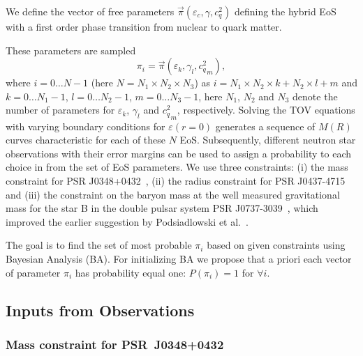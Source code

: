 {We define the vector of free parameters $\overrightarrow{\pi}\left(\varepsilon_{c},\gamma,{c}_{q}^{2}\right)$
defining the hybrid EoS with a first order phase transition from nuclear
to quark matter. %
}

{These parameters are sampled
\begin{equation}
\pi_{i}=\overrightarrow{\pi}\left(\varepsilon_{k},\gamma_{l},{{c}_{q}^{2}}_{m}\right),\label{pi_vec}
\end{equation}
where $i=0\dots N-1$ (here $N=N_{1}\times N_{2}\times N_{3}$) as
$i=N_{1}\times N_{2}\times k+N_{2}\times l+m$ and $k=0\dots N_{1}-1$,
$l=0\dots N_{2}-1$, $m=0\dots N_{3}-1$, here $N_{1}$, $N_{2}$
and $N_{3}$ denote the number of parameters for $\varepsilon_{k}$,
$\gamma_{l}$ and ${{c}_{q}^{2}}_{m}$, respectively. Solving the
TOV equations with varying boundary conditions for $\varepsilon(r=0)$
generates a sequence of $M(R)$ curves characteristic for each of
these $N$ EoS. Subsequently, different neutron star observations
with their error margins can be used to assign a probability to each
choice in from the set of EoS parameters. We use three constraints:
(i) the mass constraint for PSR J0348+0432~\cite{Antoniadis:2013pzd},
(ii) the radius constraint for PSR J0437-4715~\cite{Bogdanov:2012md}
and (iii) the constraint on the baryon mass at the well measured gravitational
mass for the star B in the double pulsar system PSR J0737-3039~\cite{Kitaura:2006bt},
which improved the earlier suggestion by Podsiadlowski et al.~\cite{Podsiadlowski:2005ig}.}

{The goal is to find the set of most probable $\pi_{i}$ based
on given constraints using Bayesian Analysis (BA). For initializing
BA we propose that }{a priori}{ each vector of parameter
$\pi_{i}$ has probability equal one: $P\left(\pi_{i}\right)=1$ for
$\forall i$.}


\subsection{Inputs from Observations}


\subsubsection{Mass constraint for PSR~J0348+0432}

